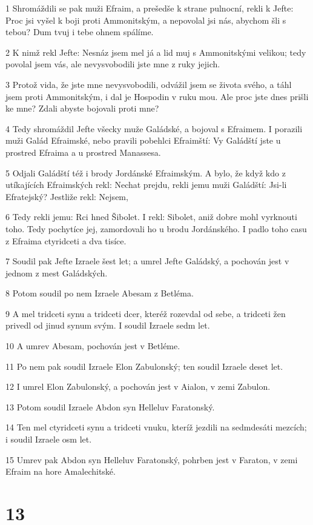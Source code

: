 \par 1 Shromáždili se pak muži Efraim, a prešedše k strane pulnocní, rekli k Jefte: Proc jsi vyšel k boji proti Ammonitským, a nepovolal jsi nás, abychom šli s tebou? Dum tvuj i tebe ohnem spálíme.
\par 2 K nimž rekl Jefte: Nesnáz jsem mel já a lid muj s Ammonitskými velikou; tedy povolal jsem vás, ale nevysvobodili jste mne z ruky jejich.
\par 3 Protož vida, že jste mne nevysvobodili, odvážil jsem se života svého, a táhl jsem proti Ammonitským, i dal je Hospodin v ruku mou. Ale proc jste dnes prišli ke mne? Zdali abyste bojovali proti mne?
\par 4 Tedy shromáždil Jefte všecky muže Galádské, a bojoval s Efraimem. I porazili muži Galád Efraimské, nebo pravili pobehlci Efraimští: Vy Galádští jste u prostred Efraima a u prostred Manassesa.
\par 5 Odjali Galádští též i brody Jordánské Efraimským. A bylo, že když kdo z utíkajících Efraimských rekl: Nechat prejdu, rekli jemu muži Galádští: Jsi-li Efratejský? Jestliže rekl: Nejsem,
\par 6 Tedy rekli jemu: Rci hned Šibolet. I rekl: Sibolet, aniž dobre mohl vyrknouti toho. Tedy pochytíce jej, zamordovali ho u brodu Jordánského. I padlo toho casu z Efraima ctyridceti a dva tisíce.
\par 7 Soudil pak Jefte Izraele šest let; a umrel Jefte Galádský, a pochován jest v jednom z mest Galádských.
\par 8 Potom soudil po nem Izraele Abesam z Betléma.
\par 9 A mel tridceti synu a tridceti dcer, kteréž rozevdal od sebe, a tridceti žen privedl od jinud synum svým. I soudil Izraele sedm let.
\par 10 A umrev Abesam, pochován jest v Betléme.
\par 11 Po nem pak soudil Izraele Elon Zabulonský; ten soudil Izraele deset let.
\par 12 I umrel Elon Zabulonský, a pochován jest v Aialon, v zemi Zabulon.
\par 13 Potom soudil Izraele Abdon syn Helleluv Faratonský.
\par 14 Ten mel ctyridceti synu a tridceti vnuku, kteríž jezdili na sedmdesáti mezcích; i soudil Izraele osm let.
\par 15 Umrev pak Abdon syn Helleluv Faratonský, pohrben jest v Faraton, v zemi Efraim na hore Amalechitské.

\chapter{13}

